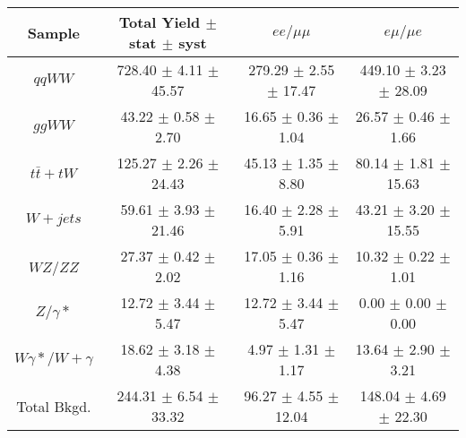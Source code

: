 \begin{table}[ht!]
  \begin{center}
  \begin{tabular} {|c|c|c|c|}
\hline
Sample                & Total Yield $\pm$ stat $\pm$ syst & $ee/\mu\mu$  & $e\mu/\mu e$ \\ \hline \hline
$qqWW$                & 728.40 $\pm$ 4.11 $\pm$ 45.57   & 279.29 $\pm$ 2.55 $\pm$ 17.47   & 449.10 $\pm$ 3.23 $\pm$ 28.09 \\ \hline
$ggWW$                & 43.22 $\pm$ 0.58 $\pm$ 2.70   & 16.65 $\pm$ 0.36 $\pm$ 1.04   & 26.57 $\pm$ 0.46 $\pm$ 1.66 \\ \hline
$t\bar{t} + tW$       & 125.27 $\pm$ 2.26 $\pm$ 24.43   & 45.13 $\pm$ 1.35 $\pm$ 8.80   & 80.14 $\pm$ 1.81 $\pm$ 15.63 \\ \hline
$W+jets$              & 59.61 $\pm$ 3.93 $\pm$ 21.46   & 16.40 $\pm$ 2.28 $\pm$ 5.91   & 43.21 $\pm$ 3.20 $\pm$ 15.55 \\ \hline
$WZ$/$ZZ$             & 27.37 $\pm$ 0.42 $\pm$ 2.02   & 17.05 $\pm$ 0.36 $\pm$ 1.16   & 10.32 $\pm$ 0.22 $\pm$ 1.01 \\ \hline
$Z/\gamma*$           & 12.72 $\pm$ 3.44 $\pm$ 5.47   & 12.72 $\pm$ 3.44 $\pm$ 5.47   & 0.00 $\pm$ 0.00 $\pm$ 0.00 \\ \hline
$W\gamma*/W+\gamma$   & 18.62 $\pm$ 3.18 $\pm$ 4.38   & 4.97 $\pm$ 1.31 $\pm$ 1.17   & 13.64 $\pm$ 2.90 $\pm$ 3.21 \\ \hline \hline
Total Bkgd.           & 244.31 $\pm$ 6.54 $\pm$ 33.32   & 96.27 $\pm$ 4.55 $\pm$ 12.04   & 148.04 $\pm$ 4.69 $\pm$ 22.30 \\ \hline \hline

\end{tabular}
\end{center}
\end{table}
